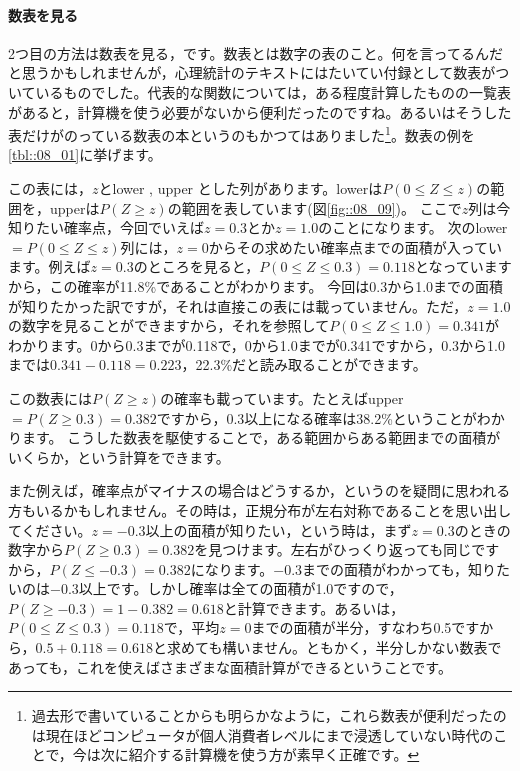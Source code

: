 \documentclass{ltjbook}
\begin{document}
\paragraph{数表を見る} 2つ目の方法は数表を見る，です。数表とは数字の表のこと。何を言ってるんだと思うかもしれませんが，心理統計のテキストにはたいてい付録として数表がついているものでした。代表的な関数については，ある程度計算したものの一覧表があると，計算機を使う必要がないから便利だったのですね。あるいはそうした表だけがのっている数表の本というのもかつてはありました\footnote{過去形で書いていることからも明らかなように，これら数表が便利だったのは現在ほどコンピュータが個人消費者レベルにまで浸透していない時代のことで，今は次に紹介する計算機を使う方が素早く正確です。}。数表の例を\ref{tbl::08_01}に挙げます。

この表には，$z$とlower , upper とした列があります。lowerは$P(0\le Z \le z)$の範囲を，upperは$P(Z\ge z)$の範囲を表しています(図\ref{fig::08_09})。
ここで$z$列は今知りたい確率点，今回でいえば$z=0.3$とか$z=1.0$のことになります。
次のlower$=P(0\le Z \le z)$列には，$z=0$からその求めたい確率点までの面積が入っています。例えば$z=0.3$のところを見ると，$P(0\le Z \le 0.3)=0.118$となっていますから，この確率が11.8\%であることがわかります。
今回は0.3から1.0までの面積が知りたかった訳ですが，それは直接この表には載っていません。ただ，$z=1.0$の数字を見ることができますから，それを参照して$P(0\le Z \le 1.0)=0.341$がわかります。0から0.3までが0.118で，0から1.0までが0.341ですから，0.3から1.0までは$0.341-0.118=0.223$，22.3\%だと読み取ることができます。

この数表には$P(Z\ge z)$の確率も載っています。たとえばupper$=P(Z\ge 0.3)=0.382$ですから，0.3以上になる確率は38.2\%ということがわかります。
こうした数表を駆使することで，ある範囲からある範囲までの面積がいくらか，という計算をできます。

また例えば，確率点がマイナスの場合はどうするか，というのを疑問に思われる方もいるかもしれません。その時は，正規分布が左右対称であることを思い出してください。$z=-0.3$以上の面積が知りたい，という時は，まず$z=0.3$のときの数字から$P(Z\ge 0.3)=0.382$を見つけます。左右がひっくり返っても同じですから，$P(Z \le -0.3)=0.382$になります。$-0.3$までの面積がわかっても，知りたいのは$-0.3$以上です。しかし確率は全ての面積が1.0ですので，$P(Z \ge -0.3) = 1-0.382 = 0.618$と計算できます。あるいは，$P(0\le Z \le 0.3)=0.118$で，平均$z=0$までの面積が半分，すなわち0.5ですから，$0.5+0.118=0.618$と求めても構いません。ともかく，半分しかない数表であっても，これを使えばさまざまな面積計算ができるということです。
\end{document}
